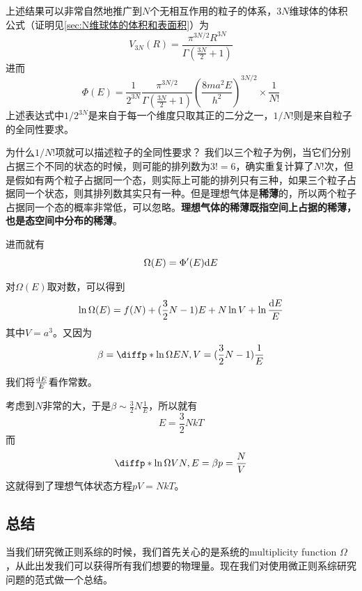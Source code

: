 上述结果可以非常自然地推广到$N$个无相互作用的粒子的体系，$3N$维球体的体积公式（证明见\ref{sec:N维球体的体积和表面积}）为
\begin{equation}
       V_{3N}(R)=\frac{\pi^{3N/2}R^{3N}}{\Gamma (\frac{3N}{2}+1)}
\end{equation}
进而\begin{equation}
       \Phi(E)=\frac{1}{2^{3N}} \frac{\pi^{3N/2}}{\Gamma(\frac{3N}{2}+1)} \left(\frac{8ma^2 E }{h^2}\right)^{3N/2} \times\frac{1}{N!}
\end{equation}
上述表达式中$1/2^{3N}$是来自于每一个维度只取其正的二分之一，$1/N!$则是来自粒子的全同性要求。

\begin{Dedis}
	为什么$1/N!$项就可以描述粒子的全同性要求？
	\tcblower
	我们以三个粒子为例，当它们分别占据三个不同的状态的时候，则可能的排列数为$3!=6$，确实重复计算了$N!$次，但是假如有两个粒子占据同一个态，则实际上可能的排列只有三种，如果三个粒子占据同一个状态，则其排列数其实只有一种。但是理想气体是\textbf{稀薄}的，所以两个粒子占据同一个态的概率非常低，可以忽略。\textbf{理想气体的稀薄既指空间上占据的稀薄，也是态空间中分布的稀薄}。
\end{Dedis}


进而就有\begin{equation}
       \Omega(E)=\Phi'(E)\mathrm{d} E
\end{equation}

对$\Omega(E)$取对数，可以得到\begin{equation}
       \ln \Omega(E)=f(N)+(\frac{3}{2}N-1)E+N\ln V+\ln \frac{\mathrm{d} E}{E}
\end{equation}
其中$V=a^3$。又因为\begin{equation}
       \beta=\diffp*{\ln\Omega}{E}{N,V}=(\frac{3}{2}N-1)\frac{1}{E}
\end{equation}

\begin{remark}
我们将$\frac{\mathrm{d} E}{E}$看作常数。       
\end{remark}

考虑到$N$非常的大，于是$\displaystyle \beta\sim \frac{3}{2}N\frac{1}{E}$，所以就有\begin{equation}
       E=\frac{3}{2}NkT
\end{equation}
而\begin{equation}
       \diffp*{\ln\Omega}{V}{N,E}=\beta p=\frac{N}{V}
\end{equation}
这就得到了理想气体状态方程$pV=NkT$。
\subsection{总结} %
\label{sub:1.3总结}
当我们研究微正则系综的时候，我们首先关心的是系统的multiplicity function $\Omega$，从此出发我们可以获得所有我们想要的物理量。现在我们对使用微正则系综研究问题的范式做一个总结。

